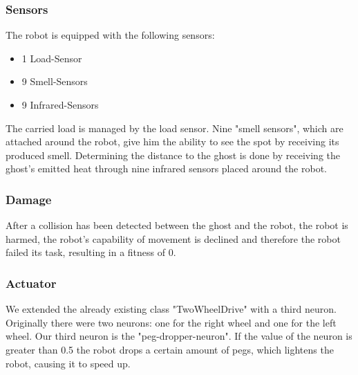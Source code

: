 \documentclass[12pt,fleqn,a4paper]{article}
\begin{document}
\subsubsection{Sensors}
The robot is equipped with the following sensors:
\begin{itemize}
   \item 1 Load-Sensor
   \item 9 Smell-Sensors
   \item 9 Infrared-Sensors
\end{itemize}
The carried load is managed by the load sensor. Nine "smell sensors", which are attached around the robot, give him the ability to see the spot by receiving its produced smell. Determining the distance to the ghost is done by receiving the ghost's emitted heat through nine infrared sensors placed around the robot.

\subsubsection{Damage}
After a collision has been detected between the ghost and the robot, the robot is harmed, the robot's capability of movement is declined and therefore the robot failed its task, resulting in a fitness of 0.

\subsubsection{Actuator}
We extended the already existing class "TwoWheelDrive" with a third neuron. Originally there were two neurons: one for the right wheel and one for the left wheel. Our third neuron is the "peg-dropper-neuron". If the value of the neuron is greater than 0.5 the robot drops a certain amount of pegs, which lightens the robot, causing it to speed up.
\end{document}
